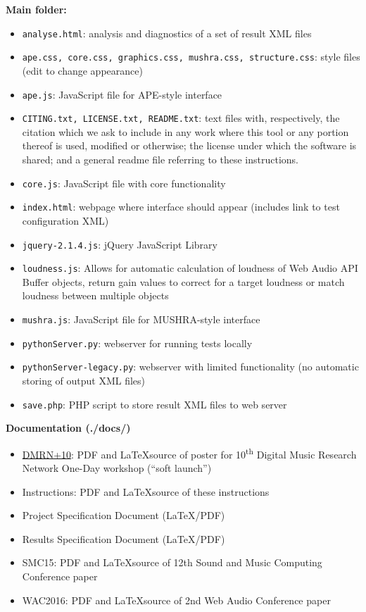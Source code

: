 \documentclass[11pt, oneside]{article}   	%
\begin{document}
		\textbf{Main folder:} 
			\begin{itemize}
	            	\item \texttt{analyse.html}: analysis and diagnostics of a set of result XML files
	            	\item \texttt{ape.css, core.css, graphics.css, mushra.css, structure.css}: style files (edit to change appearance)
	            	\item \texttt{ape.js}: JavaScript file for APE-style interface \cite{ape}
	            	\item \texttt{CITING.txt, LICENSE.txt, README.txt}: text files with, respectively, the citation which we ask to include in any work where this tool or any portion thereof is used, modified or otherwise; the license under which the software is shared; and a general readme file referring to these instructions.
	            	\item \texttt{core.js}: JavaScript file with core functionality
	            	\item \texttt{index.html}: webpage where interface should appear (includes link to test configuration XML)
	            	\item \texttt{jquery-2.1.4.js}: jQuery JavaScript Library
	            	\item \texttt{loudness.js}: Allows for automatic calculation of loudness of Web Audio API Buffer objects, return gain values to correct for a target loudness or match loudness between multiple objects
	            	\item \texttt{mushra.js}: JavaScript file for MUSHRA-style interface \cite{mushra}
	            	\item \texttt{pythonServer.py}: webserver for running tests locally
	            	\item \texttt{pythonServer-legacy.py}: webserver with limited functionality (no automatic storing of output XML files)
	            	\item \texttt{save.php}: PHP script to store result XML files to web server\\
			\end{itemize}
	     \textbf{Documentation (./docs/)}
	         \begin{itemize}
	         		\item \href{http://c4dm.eecs.qmul.ac.uk/dmrn/events/dmrnp10/#posters}{DMRN+10}: PDF and \LaTeX source of poster for 10\textsuperscript{th} Digital Music Research Network One-Day workshop (``soft launch'')
	         		\item Instructions: PDF and \LaTeX source of these instructions
	            	\item Project Specification Document (\LaTeX/PDF)
	            	\item Results Specification Document (\LaTeX/PDF)
	            	\item SMC15: PDF and \LaTeX  source of 12th Sound and Music Computing Conference paper \cite{waet}
	            	\item WAC2016: PDF and \LaTeX  source of 2nd Web Audio Conference paper\\
			\end{itemize}
\end{document}

